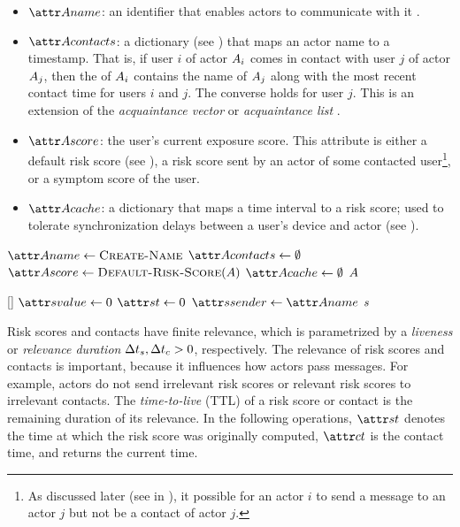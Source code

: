 \begin{itemize}
	\item $\aActorName$: an identifier that enables actors to communicate with it \cite{Hewitt1977, AghaThesis1985}.
	\item $\aActorContacts$: a dictionary (see ) that maps an actor name to a timestamp. That is, if user $i$ of actor $A_i$ comes in contact with user $j$ of actor $A_j$, then the \emph{\nContactsAttr} of $A_i$ contains the name of $A_j$ along with the most recent contact time for users $i$ and $j$. The converse holds for user $j$. This is an extension of the \emph{acquaintance vector} \cite{Hewitt1977} or \emph{acquaintance list} \cite{AghaThesis1985, Agha1985}.
	\item $\aActorScore$: the user's current exposure score. This attribute is either a default risk score (see \cDefaultScore), a risk score sent by an actor of some contacted user\footnote{As discussed later (see \cHandleContactMessage{} in ), it possible for an actor $i$ to send a message to an actor $j$ but not be a contact of actor $j$.}, or a symptom score of the user.
	\item $\aActorCache$: a dictionary that maps a time interval to a risk score; used to tolerate synchronization delays between a user's device and actor (see ).
\end{itemize}
%
\begin{function}{\nCreateActor}
    \State $\aActorName \assign \cCreateName$
    \State $\aActorContacts \assign \emptyset$
    \State $\aActorScore \assign \cDefaultScore[\vActor]$
    \State $\aActorCache \assign \emptyset$
    \State \Return $A$
\end{function}
\begin{function}{\nDefaultScore}[\vActor]
    \State $\aScoreValue \assign 0$
    \State $\aScoreTime \assign 0$
    \State $\aScoreSender \assign \aActorName$
    \State \Return $s$
\end{function}
%
Risk scores and contacts have finite relevance, which is parametrized by a \emph{liveness} or \emph{relevance duration} ${\Delta}t_s, {\Delta}t_c > 0$, respectively. The relevance of risk scores and contacts is important, because it influences how actors pass messages. For example, actors do not send irrelevant risk scores or relevant risk scores to irrelevant contacts. The \emph{time-to-live} (TTL) of a risk score or contact is the remaining duration of its relevance. In the following operations, $\aScoreTime$ denotes the time at which the risk score was originally computed, $\aContactTime$ is the contact time, and \cGetTime{} returns the current time.
